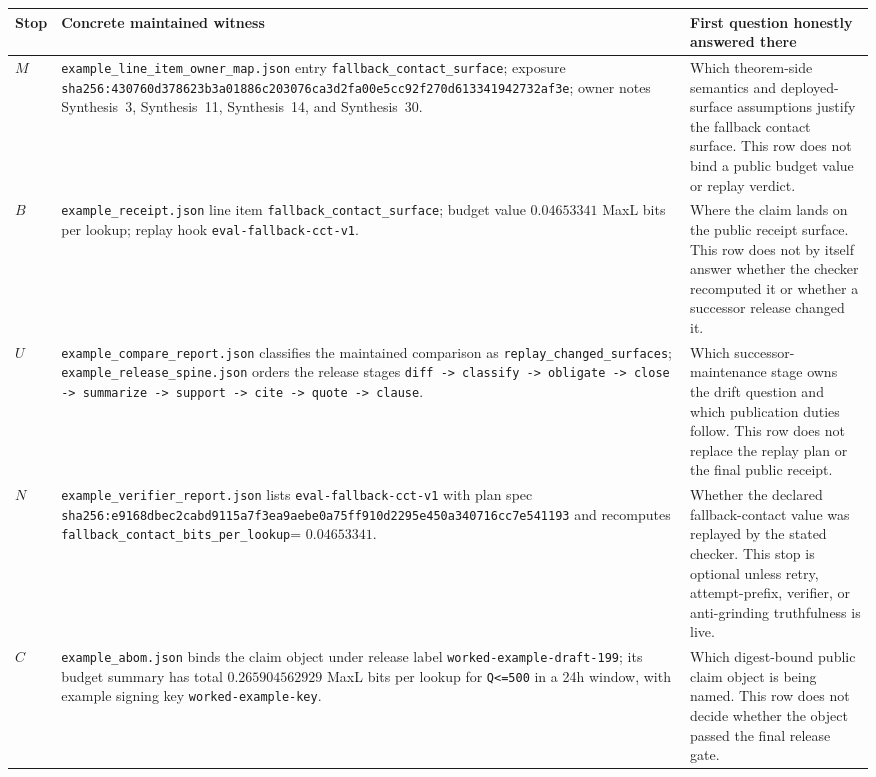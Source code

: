 \documentclass[11pt]{article}
\begin{document}
\begin{table}[t]
\centering
\small
\begin{tabularx}{\linewidth}{@{}lX X@{}}
\toprule
Stop & Concrete maintained witness & First question honestly answered there \\
\midrule
$M$ & \nolinkurl{example\_line\_item\_owner\_map.json} entry \nolinkurl{fallback\_contact\_surface}; exposure \nolinkurl{sha256:430760d378623b3a01886c203076ca3d2fa00e5cc92f270d613341942732af3e}; owner notes Synthesis~3, Synthesis~11, Synthesis~14, and Synthesis~30. & Which theorem-side semantics and deployed-surface assumptions justify the fallback contact surface. This row does not bind a public budget value or replay verdict. \\
$B$ & \nolinkurl{example\_receipt.json} line item \nolinkurl{fallback\_contact\_surface}; budget value $0.04653341$ MaxL bits per lookup; replay hook \nolinkurl{eval-fallback-cct-v1}. & Where the claim lands on the public receipt surface. This row does not by itself answer whether the checker recomputed it or whether a successor release changed it. \\
$U$ & \nolinkurl{example\_compare\_report.json} classifies the maintained comparison as \nolinkurl{replay\_changed\_surfaces}; \nolinkurl{example\_release\_spine.json} orders the release stages \nolinkurl{diff -> classify -> obligate -> close -> summarize -> support -> cite -> quote -> clause}. & Which successor-maintenance stage owns the drift question and which publication duties follow. This row does not replace the replay plan or the final public receipt. \\
$N$ & \nolinkurl{example\_verifier\_report.json} lists \nolinkurl{eval-fallback-cct-v1} with plan spec \nolinkurl{sha256:e9168dbec2cabd9115a7f3ea9aebe0a75ff910d2295e450a340716cc7e541193} and recomputes \nolinkurl{fallback\_contact\_bits\_per\_lookup}= $0.04653341$. & Whether the declared fallback-contact value was replayed by the stated checker. This stop is optional unless retry, attempt-prefix, verifier, or anti-grinding truthfulness is live. \\
$C$ & \nolinkurl{example\_abom.json} binds the claim object under release label \nolinkurl{worked-example-draft-199}; its budget summary has total $0.265904562929$ MaxL bits per lookup for \nolinkurl{Q<=500} in a 24h window, with example signing key \nolinkurl{worked-example-key}. & Which digest-bound public claim object is being named. This row does not decide whether the object passed the final release gate. \\

\end{tabularx}
\end{table}
\end{document}
